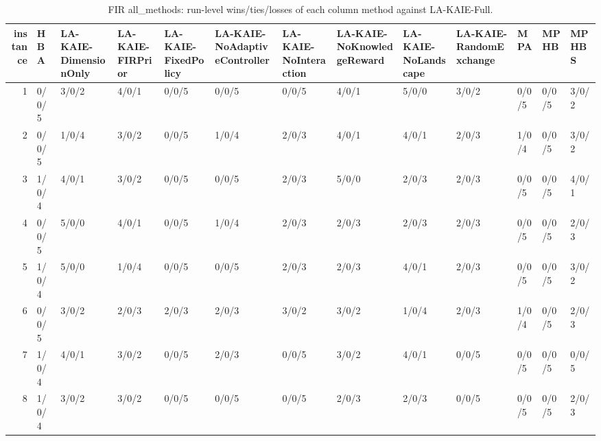 \begin{table}[t]
\centering
\scriptsize
\caption{FIR all_methods: run-level wins/ties/losses of each column method against LA-KAIE-Full.}
\label{tab:fir_all_methods_wtl}
\begin{tabular}{rllllllllllll}
\toprule
instance & HBA & LA-KAIE-DimensionOnly & LA-KAIE-FIRPrior & LA-KAIE-FixedPolicy & LA-KAIE-NoAdaptiveController & LA-KAIE-NoInteraction & LA-KAIE-NoKnowledgeReward & LA-KAIE-NoLandscape & LA-KAIE-RandomExchange & MPA & MPHB & MPHBS \\
\midrule
1 & 0/0/5 & 3/0/2 & 4/0/1 & 0/0/5 & 0/0/5 & 0/0/5 & 4/0/1 & 5/0/0 & 3/0/2 & 0/0/5 & 0/0/5 & 3/0/2 \\
2 & 0/0/5 & 1/0/4 & 3/0/2 & 0/0/5 & 1/0/4 & 2/0/3 & 4/0/1 & 4/0/1 & 2/0/3 & 1/0/4 & 0/0/5 & 3/0/2 \\
3 & 1/0/4 & 4/0/1 & 3/0/2 & 0/0/5 & 0/0/5 & 2/0/3 & 5/0/0 & 2/0/3 & 2/0/3 & 0/0/5 & 0/0/5 & 4/0/1 \\
4 & 0/0/5 & 5/0/0 & 4/0/1 & 0/0/5 & 1/0/4 & 2/0/3 & 2/0/3 & 2/0/3 & 2/0/3 & 0/0/5 & 0/0/5 & 2/0/3 \\
5 & 1/0/4 & 5/0/0 & 1/0/4 & 0/0/5 & 0/0/5 & 2/0/3 & 2/0/3 & 4/0/1 & 2/0/3 & 0/0/5 & 0/0/5 & 3/0/2 \\
6 & 0/0/5 & 3/0/2 & 2/0/3 & 2/0/3 & 2/0/3 & 3/0/2 & 3/0/2 & 1/0/4 & 2/0/3 & 1/0/4 & 0/0/5 & 2/0/3 \\
7 & 1/0/4 & 4/0/1 & 3/0/2 & 0/0/5 & 2/0/3 & 0/0/5 & 3/0/2 & 4/0/1 & 0/0/5 & 0/0/5 & 0/0/5 & 0/0/5 \\
8 & 1/0/4 & 3/0/2 & 3/0/2 & 0/0/5 & 0/0/5 & 0/0/5 & 2/0/3 & 2/0/3 & 0/0/5 & 0/0/5 & 0/0/5 & 2/0/3 \\
\bottomrule
\end{tabular}
\end{table}

